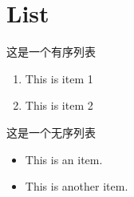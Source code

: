 \section{List}

这是一个有序列表

\begin{enumerate}
    \item This is item 1
    \item This is item 2
\end{enumerate}

这是一个无序列表

\begin{itemize}
    \item This is an item.
    \item This is another item.
\end{itemize}
